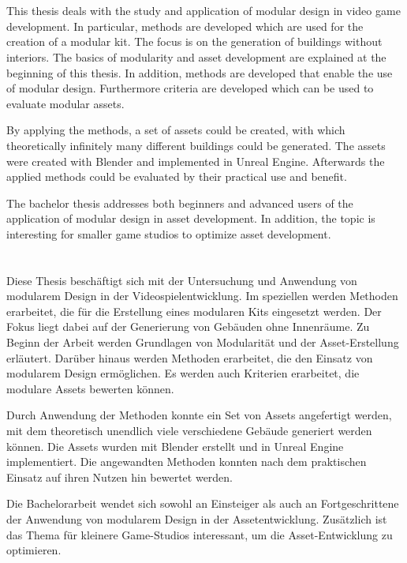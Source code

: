 \thispagestyle{empty}
\section*{\centering\abstractname}
This thesis deals with the study and application of modular design in video game development. In particular, methods are developed which are used for the creation of a modular kit. The focus is on the generation of buildings without interiors. The basics of modularity and asset development are explained at the beginning of this thesis. In addition, methods are developed that enable the use of modular design. Furthermore criteria are developed which can be used to evaluate modular assets.
\par
By applying the methods, a set of assets could be created, with which theoretically infinitely many different buildings could be generated. The assets were created with Blender and implemented in Unreal Engine. Afterwards the applied methods could be evaluated by their practical use and benefit.
\par
The bachelor thesis addresses both beginners and advanced users of the application of modular design in asset development. In addition, the topic is interesting for smaller game studios to optimize asset development.
\section*{\centering\abstractname}
Diese Thesis beschäftigt sich mit der Untersuchung und Anwendung von modularem Design in der Videospielentwicklung. Im speziellen werden Methoden erarbeitet, die für die Erstellung eines modularen Kits eingesetzt werden. Der Fokus liegt dabei auf der Generierung von Gebäuden ohne Innenräume. Zu Beginn der Arbeit werden Grundlagen von Modularität und der Asset-Erstellung erläutert. Darüber hinaus werden Methoden erarbeitet, die den Einsatz von modularem Design ermöglichen. Es werden auch Kriterien erarbeitet, die modulare Assets bewerten können.
\par
Durch Anwendung der Methoden konnte ein Set von Assets angefertigt werden, mit dem theoretisch unendlich viele verschiedene Gebäude generiert werden können. Die Assets wurden mit Blender erstellt und in Unreal Engine implementiert. Die angewandten Methoden konnten nach dem praktischen Einsatz auf ihren Nutzen hin bewertet werden.
\par
Die Bachelorarbeit wendet sich sowohl an Einsteiger als auch an Fortgeschrittene der Anwendung von modularem Design in der Assetentwicklung. Zusätzlich ist das Thema für kleinere Game-Studios interessant, um die Asset-Entwicklung zu optimieren. 